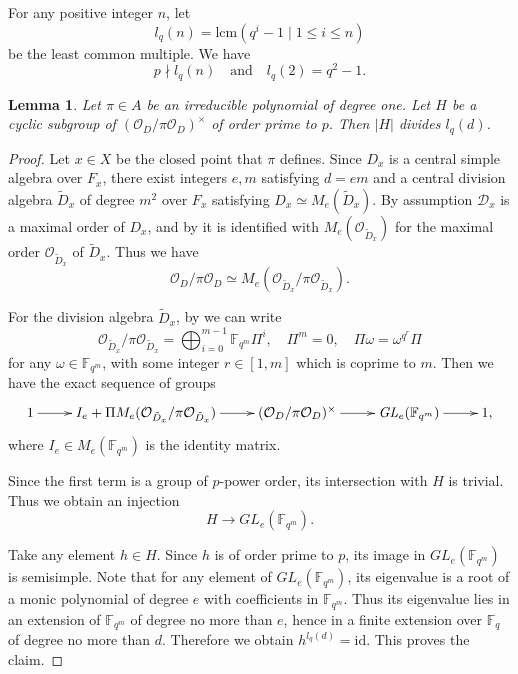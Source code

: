 \documentclass[10pt]{amsart}
\theoremstyle{plain}
\newtheorem{lem}[thm]{Lemma}
\theoremstyle{definition}
\newcommand{\id}{\mathrm{id}}
\newcommand{\lcm}{\mathrm{lcm}}
\newcommand{\cO}{\mathcal{O}}
\newcommand{\bF}{\mathbb{F}}
\newcommand{\sD}{\mathscr{D}}
\begin{document}
For any positive integer $n$, let
\[
l_q(n)=\lcm(q^i-1\mid 1\leq i\leq n)
\]
be the least common multiple.
We have
\[
p\nmid l_q(n)\quad\text{and}\quad l_q(2)=q^2-1.
\]

\begin{lem}\label{LemGCyclicSub}
	Let $\pi\in A$ be an irreducible polynomial of degree one.
	Let $H$ be a cyclic subgroup of $(\cO_D/\pi \cO_D)^\times$ of order prime to $p$. 
	Then $|H|$ divides $l_q(d)$.
\end{lem}
\begin{proof}
	Let $x\in X$ be the closed point that $\pi$ defines.
	Since $D_x$ is a central simple algebra over $F_x$, there exist integers $e,m$ satisfying $d=em$ and a central division algebra $\tilde{D}_x$ of degree 
	$m^2$ over $F_x$
	satisfying $D_x\simeq M_e(\tilde{D}_x)$. By assumption $\sD_x$ is a maximal order of $D_x$, and by \cite[Theorem 17.3 (ii)]{Rei}
	it is identified with $M_e(\cO_{\tilde{D}_x})$ for the maximal order $\cO_{\tilde{D}_x}$ of $\tilde{D}_x$. Thus we have
	\[
	\cO_D/\pi \cO_D\simeq M_e(\cO_{\tilde{D}_x}/\pi \cO_{\tilde{D}_x}).
	\]
	
	For the division algebra $\tilde{D}_x$, by \cite[Theorem 14.5]{Rei} we can write
	\[
	\cO_{\tilde{D}_x}/\pi \cO_{\tilde{D}_x}=\bigoplus_{i=0}^{m-1}\bF_{q^m}\Pi^i,\quad \Pi^m=0,\quad \Pi \omega=\omega^{q^r}\Pi
	\]
	for any $\omega\in \bF_{q^m}$, with some integer $r\in [1,m]$ which is coprime to $m$. 
	Then we have the exact sequence of groups
	\begin{equation}\label{EqnExactG}
	\xymatrix{
		1 \ar[r] & I_e+\Pi M_e(\cO_{\tilde{D}_x}/\pi \cO_{\tilde{D}_x}) \ar[r] & (\cO_D/\pi \cO_D)^\times \ar[r] & \mathit{GL}_e(\bF_{q^m}) \ar[r] &1,
	}
	\end{equation}
	where $I_e\in M_e(\bF_{q^m})$ is the identity matrix. 
	
	Since the first term is a group of $p$-power order, its intersection with $H$ is trivial. Thus we obtain an injection
	\[
	H\to \mathit{GL}_e(\bF_{q^m}).
	\]
	
	Take any element $h\in H$. Since $h$ is of order prime to $p$, its image in $\mathit{GL}_e(\bF_{q^m})$ is semisimple.
	Note that for any element of $\mathit{GL}_e(\bF_{q^m})$, its eigenvalue is a root of a monic polynomial of degree $e$ with coefficients in $
	\bF_{q^m}$.
	Thus its eigenvalue lies in an extension of $\bF_{q^m}$ of degree no more than $e$,
	hence in a finite extension over $\bF_q$ of degree no more than $d$. Therefore we obtain $h^{l_q(d)}=\id$. This proves the claim.
\end{proof}
\end{document}
